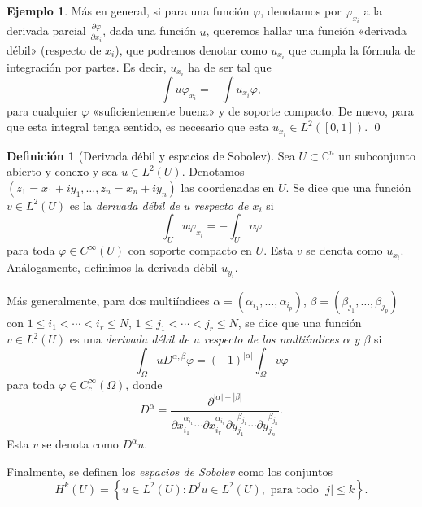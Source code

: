 \documentclass[12pt,a4paper]{article}
\theoremstyle{definition} \newtheorem{defn}[thm]{Definición}
\theoremstyle{definition} \newtheorem{ejemplo}[thm]{Ejemplo}
\theoremstyle{definition} \newtheorem{ejercicio}[thm]{Ejercicio}
\theoremstyle{remark} \newtheorem*{obs}{Observación}
\newcommand{\CC}{\mathbb{C}}
\begin{document}
\begin{ejemplo}
  Más en general, si para una función $\varphi$, denotamos por $\varphi_{x_i}$ a la derivada parcial $\frac{\partial \varphi}{\partial x_i}$, dada una función $u$, queremos hallar una función «derivada débil» (respecto de $x_i$), que podremos denotar como $u_{x_i}$ que cumpla la fórmula de integración por partes. Es decir, $u_{x_i}$ ha de ser tal que
  \begin{equation*}
    \int u \varphi_{x_i}=-\int u_{x_i} \varphi,
  \end{equation*}
  para cualquier $\varphi$ «suficientemente buena» y de soporte compacto. De nuevo, para que esta integral tenga sentido, es necesario que esta $u_{x_i}\in L^2([0,1])$. \qed
\end{ejemplo}

\begin{defn}[Derivada débil y espacios de Sobolev]
 Sea $U\subset \CC^n$ un subconjunto abierto y conexo y sea $u\in L^2(U)$. Denotamos $(z_1=x_1+iy_1,\dots,z_n=x_n+iy_n)$ las coordenadas en $U$. Se dice que una función $v\in L^2(U)$ es la \emph{derivada débil de $u$ respecto de $x_i$} si 
  \begin{equation*}
    \int_U u \varphi_{x_i}= -\int_{U} v \varphi
  \end{equation*}
  para toda $\varphi\in C^{\infty}(U)$ con soporte compacto en $U$. Esta $v$ se denota como $u_{x_i}$. Análogamente, definimos la derivada débil $u_{y_i}$.

  Más generalmente, para dos multiíndices $\alpha=(\alpha_{i_1},\dots,\alpha_{i_p})$, $\beta=(\beta_{j_1},\dots,\beta_{j_p})$ con $1\leq i_1 <\cdots < i_r \leq N$, $1\leq j_1 <\cdots < j_r \leq N$, se dice que una función $v\in L^2(U)$ es una \emph{derivada débil de $u$ respecto de los multiíndices $\alpha$ y $\beta$}  si
  \begin{equation*}
    \int_{\Omega} u D^{\alpha,\beta} \varphi = (-1)^{|\alpha|} \int_{\Omega} v \varphi
  \end{equation*}
  para toda $\varphi \in C^{\infty}_c(\Omega)$, donde 
  \begin{equation*}
    D^{\alpha}=\frac{\partial^{|\alpha|+|\beta|}}{\partial x_{i_1}^{\alpha_{i_1}}\cdots \partial x_{i_r}^{\alpha_{i_r}}\partial y_{j_1}^{\beta_{j_1}}  \cdots \partial y_{j_n}^{\beta_{j_n}}}.
  \end{equation*}
  Esta $v$ se denota como $D^\alpha u$.

  Finalmente, se definen los \emph{espacios de Sobolev} como los conjuntos
  \begin{equation*}
    H^{k}(U)=\left\{ u \in L^2(U): D^j u \in L^2(U), \text{ para todo } |j|\leq k  \right\}.
  \end{equation*}
\end{defn}
\end{document}
